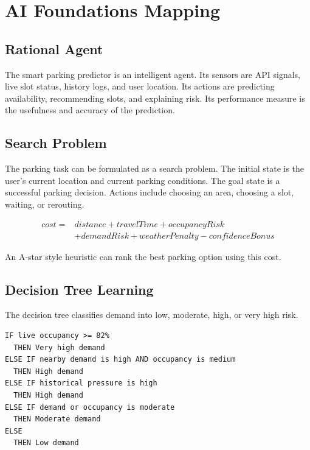\documentclass[12pt,a4paper]{article}
\begin{document}
\section{AI Foundations Mapping}
\label{sec:ai-foundations}

\subsection{Rational Agent}

The smart parking predictor is an intelligent agent. Its sensors are API signals, live slot status, history logs, and user location. Its actions are predicting availability, recommending slots, and explaining risk. Its performance measure is the usefulness and accuracy of the prediction.

\subsection{Search Problem}

The parking task can be formulated as a search problem. The initial state is the user's current location and current parking conditions. The goal state is a successful parking decision. Actions include choosing an area, choosing a slot, waiting, or rerouting.

\begin{equation}
\begin{split}
  cost ={}& distance + travelTime + occupancyRisk \\
          &+ demandRisk + weatherPenalty - confidenceBonus
\end{split}
\end{equation}

An A-star style heuristic can rank the best parking option using this cost.

\subsection{Decision Tree Learning}

The decision tree classifies demand into low, moderate, high, or very high risk.

\begin{lstlisting}
IF live occupancy >= 82%
  THEN Very high demand
ELSE IF nearby demand is high AND occupancy is medium
  THEN High demand
ELSE IF historical pressure is high
  THEN High demand
ELSE IF demand or occupancy is moderate
  THEN Moderate demand
ELSE
  THEN Low demand
\end{lstlisting}
\end{document}
